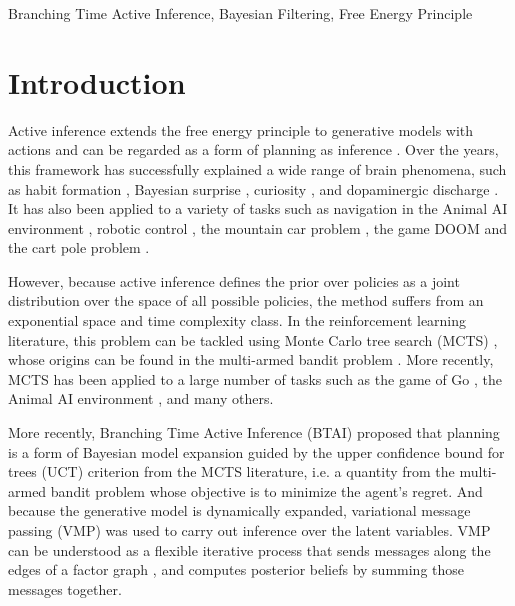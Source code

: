 \documentclass[twoside,11pt]{article}
\begin{document}
\begin{keywords}
Branching Time Active Inference, Bayesian Filtering, Free Energy Principle
\end{keywords}

\section{Introduction}

Active inference extends the free energy principle to generative models with actions \citep{FRISTON2016862,AI_TUTO,AI_VMP} and can be regarded as a form of planning as inference \citep{PAI}. Over the years, this framework has successfully explained a wide range of brain phenomena, such as habit formation \citep{FRISTON2016862}, Bayesian surprise \citep{bayes_surprise}, curiosity \citep{curiosity}, and dopaminergic discharge \citep{dopamine}. It has also been applied to a variety of tasks such as navigation in the Animal AI environment \citep{DeepAIwithMCMC}, robotic control \citep{pezzato2020active,sancaktar2020endtoend}, the mountain car problem \citep{catal2020learning}, the  game DOOM \citep{CULLEN2018809} and the cart pole problem \citep{cart_pole}.

However, because active inference defines the prior over policies as a joint distribution over the space of all possible policies, the method suffers from an exponential space and time complexity class. In the reinforcement learning literature, this problem can be tackled using Monte Carlo tree search (MCTS) \citep{6145622}, whose origins can be found in the multi-armed bandit problem \citep{Auer2002}. More recently, MCTS has been applied to a large number of tasks such as the game of Go \citep{Go}, the Animal AI environment \citep{DeepAIwithMCMC}, and many others.

More recently, Branching Time Active Inference (BTAI) \citep{AITS_THEORY,AITS_PRACTICE} proposed that planning is a form of Bayesian model expansion guided by the upper confidence bound for trees (UCT) criterion from the MCTS literature, i.e. a quantity from the multi-armed bandit problem whose objective is to minimize the agent's regret. And because the generative model is dynamically expanded, variational message passing (VMP) \citep{VMP_TUTO} was used to carry out inference over the latent variables. VMP can be understood as a flexible iterative process that sends messages along the edges of a factor graph \citep{FFG_TUTO}, and computes posterior beliefs by summing those messages together.
\end{document}

